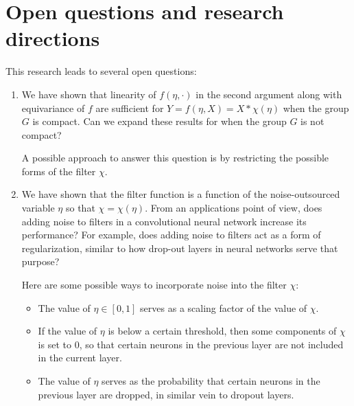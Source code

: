 

\section{Open questions and research directions}
This research leads to several open questions:
\begin{enumerate}
\item  
We have shown that linearity of $f(\eta, \cdot)$ in the second argument along with equivariance of $f$ are sufficient for $Y = f(\eta, X) = X * \chi(\eta)$ when the group $G$ is compact.
Can we expand these results for when the group $G$ is not compact?

A possible approach to answer this question is by restricting the possible forms of the filter $\chi$.

\item We have shown that the filter function is a function of the noise-outsourced variable $\eta$ so that $\chi = \chi(\eta)$.
From an applications point of view, does adding noise to filters in a convolutional neural network increase its performance?
For example, does adding noise to filters act as a form of regularization, similar to how drop-out layers in neural networks serve that purpose?

Here are some possible ways to incorporate noise into the filter $\chi$:
\begin{itemize}
	\item The value of $\eta \in [0,1]$ serves as a scaling factor of the value of $\chi$.
	\item If the value of $\eta$ is below a certain threshold, then some components of $\chi$ is set to $0$, so that certain neurons in the previous layer are not included in the current layer.
	\item The value of $\eta$ serves as the probability that certain neurons in the previous layer are dropped, in similar vein to dropout layers.
\end{itemize}
\end{enumerate}